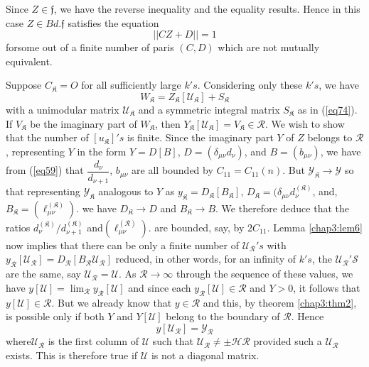 \setcounter{pageoriginal}{55}
Since $Z \in \mathfrak{f}$, we have the reverse inequality and the
equality results. Hence in this case $Z \in Bd. \mathfrak{f}$ satisfies
the equation 
\begin{equation*}
|| CZ + D || = 1 \tag{88}\label{eq88}   
\end{equation*}
for\pageoriginale some out of a finite number of paris $(C, D)$ which
are not mutually equivalent.  

\medskip
{}
Suppose $C_{\mathfrak{K}} = O$ for all sufficiently large $k'
s$. Considering only these $k' s$, we have  
$$
W_{\mathfrak{K}} = Z_{\mathfrak{K}} [\mathcal{U}_{\mathfrak{K}}] +
S_{\mathfrak{K}} 
$$
with a unimodular matrix $\mathcal{U}_{\mathfrak{K}}$ and a symmetric
integral matrix $S_{\mathfrak{K}}$ as in (\ref{eq74}). If $V_{\mathfrak{K}}$
be the imaginary part of $W_{\mathfrak{K}}$, then
$Y_{\mathfrak{K}}[\mathcal{U}_{\mathfrak{K}}] = V_{\mathfrak{K}} \in
\mathscr{R}$. We wish to show that the number of
$[u_{\mathfrak{K}}]' s$ is finite. Since the imaginary part
$Y$ of $Z$ belongs to $\mathscr{R}$, representing $Y$ in the form $Y =
D [B]$, $D = ( \delta_{\mu \nu}d_{\nu})$, and $B = (b_{\mu \nu})$, we
have from (\ref{eq59}) that $\dfrac{d_{\nu}}{d_{\nu+1}}$, $b_{\mu \nu}$ are
all bounded by $C_{11} = C_{11}(n)$. But $\mathcal{Y}_{\mathfrak{K}}
\to \mathcal{Y}$ so that representing $\mathcal{Y}_{\mathfrak{K}}$
analogous to $Y$ as $y_{\mathfrak{K}} = D_{\mathfrak{K}}
[B_{\mathfrak{K}}]$, $D_{\mathfrak{K}} = (\delta_{\mu \nu}
d^{(\mathfrak{K})}_{\nu}$, and, $B_{\mathfrak{K}} =
(\ell^{(\mathfrak{K})}_{\mu \nu})$. we have $D_{\mathfrak{K}} \to D$ and
$B_{\mathfrak{K}} \to B$. We therefore deduce that the ratios
$d^{(\mathfrak{K})}_{\nu}/d^{(\mathfrak{K})}_{\nu +1}$
and$(\ell^{(\mathscr{R})}_{\mu \nu})$. are bounded, say, by $2
C_{11}$. Lemma \ref{chap3:lem6} now implies that there can be only a
finite number 
of $\mathscr{U}_{\mathscr{R}}'s$ with
$y_{\mathscr{R}}[\mathscr{U}_{\mathscr{R}}] =
D_{\mathscr{R}}[B_{\mathscr{R}} \mathscr{U}_{\mathscr{R}}]$ reduced,
in other words, for an infinity of $k's$, the
$\mathscr{U}_{\mathscr{R}}'\mathscr{S}$ are the same, say
$\mathscr{U}_{\mathscr{R}} = \mathscr{U}$. As $\mathscr{R} \to \infty$
through the sequence of these values, we have $y[\mathscr{U}] =
\lim_{\mathscr{R}} y_{\mathscr{R}}[\mathscr{U}]$ and since each
$y_{\mathscr{R}}[\mathscr{U}] \in \mathscr{R}$ and $Y > 0$, it follows
that $y[\mathscr{U}] \in \mathscr{R}$. But we already know that $y \in
\mathscr{R}$ and this, by theorem \ref{chap3:thm2}, is possible only
if both $Y$ and 
$Y[\mathscr{U}]$ belong to the boundary of $\mathscr{R}$. Hence  
\begin{equation*}
y[\mathcal{U}_{\mathscr{R}}] = \mathscr{Y}_{\mathscr{R}} \tag{89}\label{eq89}   
\end{equation*}
where\pageoriginale $\mathscr{U}_{\mathscr{R}}$ is the first column of
$\mathscr{U}$ 
such that $\mathcal{U}_{\mathscr{R}}  \neq \pm \mathscr{H}
\mathscr{R}$ provided such a $\mathscr{U}_{\mathscr{R}}$ exists. This
is therefore true if $\mathscr{U}$ is not a diagonal matrix. 

